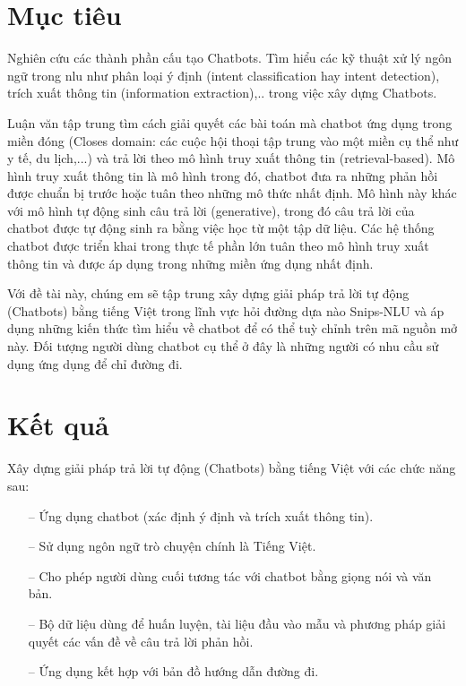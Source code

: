 \section{Mục tiêu}

Nghiên cứu các thành phần cấu tạo Chatbots. Tìm hiểu các kỹ thuật xử lý ngôn ngữ trong \ac{nlu} như phân loại ý định (intent classification hay intent detection), trích xuất thông tin (information extraction),.. trong việc xây dựng Chatbots.

Luận văn tập trung tìm cách giải quyết các bài toán mà chatbot ứng dụng trong miền đóng (Closes domain: các cuộc hội thoại tập trung vào một miền cụ thể như y tế, du lịch,...) và trả lời theo mô hình truy xuất thông tin (retrieval-based). Mô hình truy xuất thông tin là mô hình trong đó, chatbot đưa ra những phản hồi được chuẩn bị trước hoặc tuân theo những mô thức nhất định. Mô hình này khác với mô hình tự động sinh câu trả lời (generative), trong đó câu trả lời của chatbot được tự động sinh ra bằng việc học từ một tập dữ liệu. Các hệ thống chatbot được triển khai trong thực tế phần lớn tuân theo mô hình truy xuất thông tin và được áp dụng trong những miền ứng dụng nhất định.

Với đề tài này, chúng em sẽ tập trung xây dựng giải pháp trả lời tự động (Chatbots) bằng tiếng Việt trong lĩnh vực hỏi đường dựa nào Snips-NLU và áp dụng những kiến thức tìm hiểu về chatbot để có thể tuỳ chỉnh trên mã nguồn mở này. Đối tượng người dùng chatbot cụ thể ở đây là những người có nhu cầu sử dụng ứng dụng để chỉ đường đi.

\section{Kết quả}
Xây dựng giải pháp trả lời tự động (Chatbots) bằng tiếng Việt với các chức năng sau:
\begin{itemize}
    \item[--] Ứng dụng chatbot (xác định ý định và trích xuất thông tin).
    \item[--] Sử dụng ngôn ngữ trò chuyện chính là Tiếng Việt.
    \item[--] Cho phép người dùng cuối tương tác với chatbot bằng giọng nói và văn bản.
    \item[--] Bộ dữ liệu dùng để huấn luyện, tài liệu đầu vào mẫu và phương pháp giải quyết các vấn đề về câu trả lời phản hồi.
    \item[--] Ứng dụng kết hợp với bản đồ hướng dẫn đường đi.
\end{itemize}




